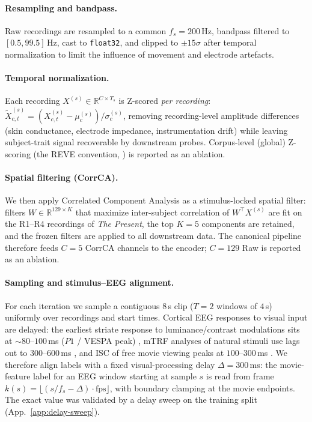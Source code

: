 \paragraph{Resampling and bandpass.}
Raw recordings are resampled to a common $f_s = 200$\,Hz, bandpass
filtered to $[0.5, 99.5]$\,Hz, cast to \texttt{float32}, and clipped
to $\pm 15\sigma$ after temporal normalization to limit the influence
of movement and electrode artefacts.

\paragraph{Temporal normalization.}
Each recording $X^{(s)} \in \mathbb{R}^{C \times T_s}$ is Z-scored
\emph{per recording}: $\tilde{X}^{(s)}_{c,t} = (X^{(s)}_{c,t} -
\mu^{(s)}_c) / \sigma^{(s)}_c$, removing recording-level amplitude
differences (skin conductance, electrode impedance, instrumentation
drift) while leaving subject-trait signal recoverable by downstream
probes. Corpus-level (global) Z-scoring (the REVE convention,
\citep{elouahidi2025reve}) is reported as an ablation.

\paragraph{Spatial filtering (CorrCA).}
We then apply Correlated Component Analysis
\citep{dmochowski2012corrca} as a stimulus-locked spatial filter:
filters $W \in \mathbb{R}^{129 \times K}$ that maximize inter-subject
correlation of $W^{\!\top} X^{(s)}$ are fit on the R1--R4 recordings
of \textit{The Present}, the top $K = 5$ components are retained, and
the frozen filters are applied to all downstream data. The canonical
pipeline therefore feeds $C = 5$ CorrCA channels to the encoder;
$C = 129$ Raw is reported as an ablation.

\paragraph{Sampling and stimulus--EEG alignment.}
For each iteration we sample a contiguous $8$\,s clip ($T = 2$
windows of $4$\,s) uniformly over recordings and start times.
Cortical EEG responses to visual input are delayed: the earliest
striate response to luminance/contrast modulations sits at
${\sim}80$--$100$\,ms ($P1$ / VESPA peak) \citep{lalor2006vespa,
lalor2009vespa, lalor2012vespa}, mTRF analyses of natural stimuli
use lags out to $300$--$600$\,ms \citep{crosse2016mtrf,
diliberto2015lowfreq, lalor2010natural}, and ISC of free movie
viewing peaks at $100$--$300$\,ms \citep{dmochowski2012corrca,
dmochowski2014audience, cohen2017isc}. We therefore align labels
with a fixed visual-processing delay $\Delta = 300$\,ms: the
movie-feature label for an EEG window starting at sample $s$ is
read from frame
$k(s) = \lfloor (s / f_s - \Delta) \cdot \mathrm{fps} \rfloor$,
with boundary clamping at the movie endpoints. The exact value was
validated by a delay sweep on the training split
(App.~\ref{app:delay-sweep}).

